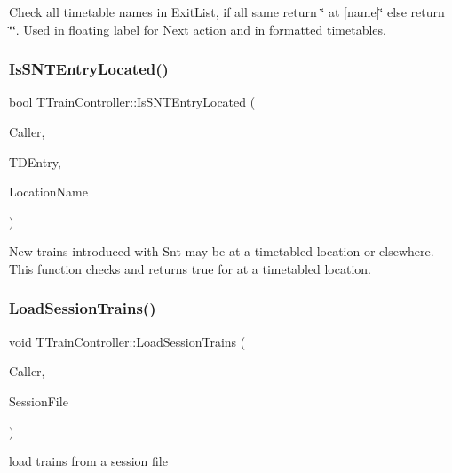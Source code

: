 Check all timetable names in Exit\+List, if all same return \char`\"{} at \mbox{[}name\mbox{]}\char`\"{} else return \char`\"{}\char`\"{}. Used in floating label for Next action and in formatted timetables. \mbox{\label{class_t_train_controller_a61cdbf0085d24c76aa84e7d5e1d11ead}} 
\subsubsection{\texorpdfstring{Is\+S\+N\+T\+Entry\+Located()}{IsSNTEntryLocated()}}
{\footnotesize\ttfamily bool T\+Train\+Controller\+::\+Is\+S\+N\+T\+Entry\+Located (\begin{DoxyParamCaption}\item[{int}]{Caller,  }\item[{const \mbox{\hyperlink{class_t_train_data_entry}{T\+Train\+Data\+Entry}} \&}]{T\+D\+Entry,  }\item[{Ansi\+String \&}]{Location\+Name }\end{DoxyParamCaption})}

New trains introduced with \textquotesingle{}Snt\textquotesingle{} may be at a timetabled location or elsewhere. This function checks and returns true for at a timetabled location. \mbox{\label{class_t_train_controller_a853ddf9799c9fd7063c81ffa1dc754d7}} 
\subsubsection{\texorpdfstring{Load\+Session\+Trains()}{LoadSessionTrains()}}
{\footnotesize\ttfamily void T\+Train\+Controller\+::\+Load\+Session\+Trains (\begin{DoxyParamCaption}\item[{int}]{Caller,  }\item[{std\+::ifstream \&}]{Session\+File }\end{DoxyParamCaption})}

load trains from a session file \mbox{\label{class_t_train_controller_ae6c929171fa673b87e68694e6f48985d}} 
